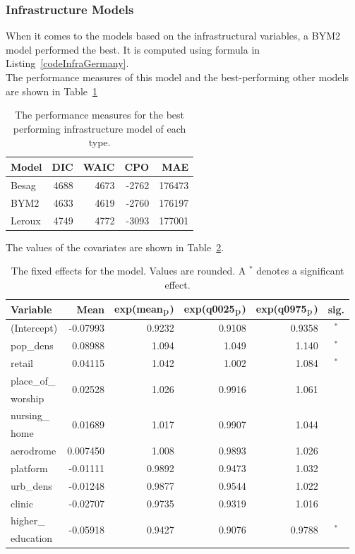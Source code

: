 \subsubsection{Infrastructure Models}\label{sssec:infraGermany}
When it comes to the models based on the infrastructural variables, a BYM2 model performed the best. It is computed using formula in Listing~\ref{codeInfraGermany}. \\
The performance measures of this model and the best-performing other models are shown in Table~\ref{infraGermany}
\begin{table}[H] 
\caption{The performance measures for the best performing infrastructure model of each type. \label{infraGermany}}
\begin{tabular}{l r r r r}
\toprule
\textbf{Model}	& \textbf{DIC}	& \textbf{WAIC} & \textbf{CPO} & \textbf{MAE}\\
\midrule
Besag & 4688 & 4673 & -2762 & 176473\\
BYM2 & 4633 & 4619 & -2760 & 176197\\
Leroux & 4749 & 4772 & -3093 & 177001\\
\bottomrule
\end{tabular}
\end{table}
The values of the covariates are shown in Table~\ref{FixedInfraGermany_spatial}.
\begin{table}[H]
\caption{The fixed effects for the model. Values are rounded. A $^*$ denotes a significant effect. \label{FixedInfraGermany_spatial}}
\begin{tabular}{l r r r r c}
\toprule
\textbf{Variable}	& \textbf{Mean}	& \textbf{exp(mean$_{\hbox{p}}$)} & \textbf{exp(q0025$_{\hbox{p}}$)} & \textbf{exp(q0975$_{\hbox{p}}$)} & \textbf{sig.}\\
\midrule
(Intercept) & -0.07993 & 0.9232 & 0.9108 & 0.9358 & $^*$\\
pop\_dens & 0.08988 & 1.094 & 1.049 & 1.140 & $^*$\\
retail & 0.04115 & 1.042 & 1.002 & 1.084 & $^*$\\
place\_of\_ & \multirow{2}{*}{0.02528} & \multirow{2}{*}{1.026} & \multirow{2}{*}{0.9916} & \multirow{2}{*}{1.061}\\
worship\\
nursing\_ & \multirow{2}{*}{0.01689} & \multirow{2}{*}{1.017} & \multirow{2}{*}{0.9907} & \multirow{2}{*}{1.044} \\
home\\
aerodrome & 0.007450 & 1.008 & 0.9893 & 1.026 \\
platform & -0.01111 & 0.9892 & 0.9473 & 1.032 \\
urb\_dens & -0.01248 & 0.9877 & 0.9544 & 1.022 \\
clinic & -0.02707 & 0.9735 & 0.9319 & 1.016  \\
higher\_ & \multirow{2}{*}{-0.05918} & \multirow{2}{*}{0.9427} & \multirow{2}{*}{0.9076} & \multirow{2}{*}{0.9788} & \multirow{2}{*}{$^*$} \\
education\\
\bottomrule
\end{tabular}
\end{table}
